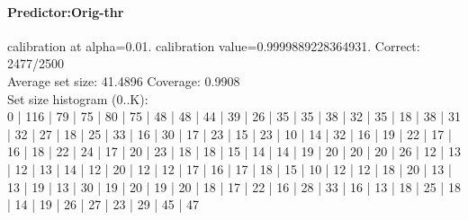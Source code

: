 \documentclass[parskip=half]{scrartcl}
\begin{document}
\paragraph{Predictor:Orig-thr} calibration at alpha=0.01. calibration value=0.9999889228364931. Correct: 2477/2500\\
Average set size: 41.4896   Coverage: 0.9908\\
Set size histogram (0..K):\\
0 | 116 | 79 | 75 | 80 | 75 | 48 | 48 | 44 | 39 | 26 | 35 | 35 | 38 | 32 | 35 | 18 | 38 | 31 | 32 | 27 | 18 | 25 | 33 | 16 | 30 | 17 | 23 | 15 | 23 | 10 | 14 | 32 | 16 | 19 | 22 | 17 | 16 | 18 | 22 | 24 | 17 | 20 | 23 | 18 | 18 | 15 | 14 | 14 | 19 | 20 | 20 | 20 | 26 | 12 | 13 | 12 | 13 | 14 | 12 | 20 | 12 | 12 | 17 | 16 | 17 | 18 | 15 | 10 | 12 | 12 | 18 | 20 | 13 | 13 | 19 | 13 | 30 | 19 | 20 | 19 | 20 | 18 | 17 | 22 | 16 | 28 | 33 | 16 | 13 | 18 | 25 | 18 | 14 | 19 | 26 | 27 | 23 | 29 | 45 | 47\\
\end{document}
